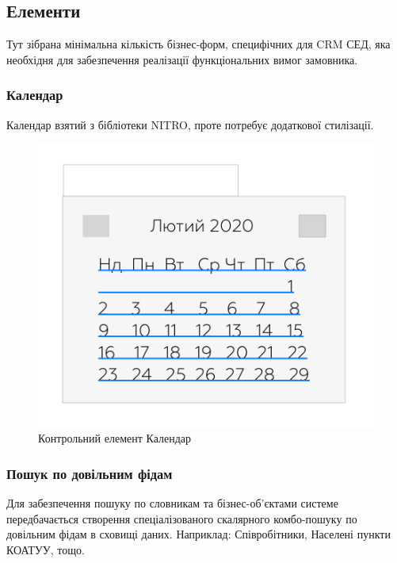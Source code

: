 \newpage
\subsection{Елементи}

Тут зібрана мінімальна кількість бізнес-форм, специфічних для CRM СЕД,
яка необхідня для забезпечення реалізації функціональних вимог замовника.

\subsubsection{Календар}

Календар взятий з бібліотеки NITRO, проте потребує додаткової стилізації.

\begin{figure}[!htbp]
\centerline{\includegraphics[scale=0.4]{calendar.png}}
\caption{Контрольний елемент Календар}
\end{figure}

\newpage
\subsubsection{Пошук по довільним фідам}

Для забезпечення пошуку по словникам та бізнес-об'єктами системе
передбачається створення спеціалізованого скалярного комбо-пошуку по довільним
фідам в сховищі даних. Наприклад: Співробітники, Населені пункти КОАТУУ, тощо.

